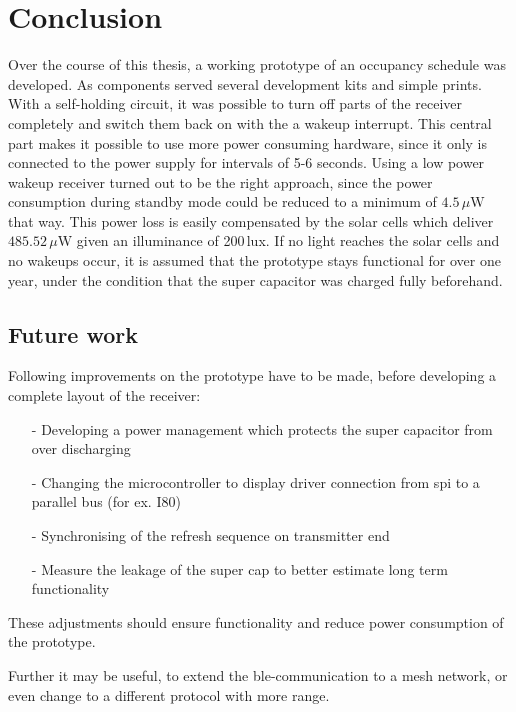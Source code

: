 \chapter{Conclusion}

Over the course of this thesis, a working prototype of an occupancy schedule was developed.
As components served several development kits and simple prints.
With a self-holding circuit, it was possible to turn off parts of the receiver completely and switch them back on with the a wakeup interrupt.
This central part makes it possible to use more power consuming hardware, since it only is connected to the power supply for intervals of 5-6 seconds.
Using a low power wakeup receiver turned out to be the right approach, since the power consumption during standby mode could be reduced to a minimum of $4.5\,\mu\text{W}$ that way.
This power loss is easily compensated by the solar cells which deliver $485.52\,\mu\text{W}$ given an illuminance of 200\,lux.
If no light reaches the solar cells and no wakeups occur, it is assumed that the prototype stays functional for over one year, under the condition that the super capacitor was charged fully beforehand.

\section*{Future work}
Following improvements on the prototype have to be made, before developing a complete layout of the receiver:
\begin{itemize}
	\item[-] Developing a power management which protects the super capacitor from over discharging
	\item[-] Changing the microcontroller to display driver connection from \acs{spi} to a parallel bus (for ex. I80)
	\item[-] Synchronising of the refresh sequence on transmitter end
	\item[-] Measure the leakage of the super cap to better estimate long term functionality
\end{itemize}
These adjustments should ensure functionality and reduce power consumption of the prototype.

Further it may be useful, to extend the \acs{ble}-communication to a mesh network, or even change to a different protocol with more range.